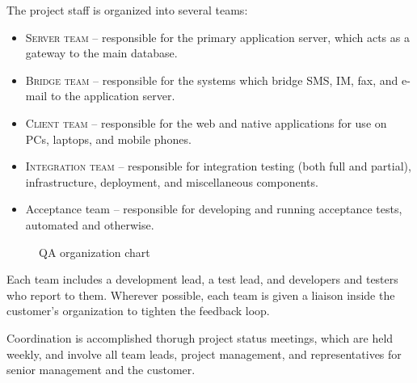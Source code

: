 \documentclass[11pt]{wacomepd}
\begin{document}
The project staff is organized into several teams:

\begin{itemize}
\item \textsc{Server team} -- responsible for the primary application server, which acts as a
  gateway to the main database.
\item \textsc{Bridge team} -- responsible for the systems which bridge SMS, IM, fax, and e-mail to
  the application server.
\item \textsc{Client team} -- responsible for the web and native applications for use on PCs,
  laptops, and mobile phones.
\item \textsc{Integration team} -- responsible for integration testing (both full and partial),
  infrastructure, deployment, and miscellaneous components.
\item {\sc Acceptance team} -- responsible for developing and running acceptance tests, automated
  and otherwise.
\end{itemize}

\begin{figure}[h]
  \begin{center}
    \caption{QA organization chart}
  \end{center}
\end{figure}

Each team includes a development lead, a test lead, and developers and testers who report to them.
Wherever possible, each team is given a liaison inside the customer's organization to tighten
the feedback loop.

Coordination is accomplished thorugh project status meetings, which are held weekly, and involve all
team leads, project management, and representatives for senior management and the customer.
\end{document}
